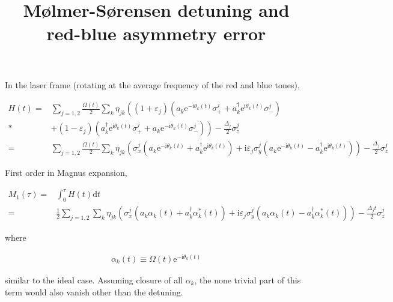 \documentclass[10pt,fleqn]{article}
\title{M{\o}lmer-S{\o}rensen detuning and red-blue asymmetry error}
\newcommand{\ud}{\mathrm{d}}
\newcommand{\ue}{\mathrm{e}}
\newcommand{\ui}{\mathrm{i}}
\newcommand{\eqar}[1]
{
  \begin{align*}
    #1
  \end{align*}
}
\newcommand{\paren}[1]{{\left({#1}\right)}}
\newcommand{\lparen}[1]{{\left({#1}\right.}}
\newcommand{\rparen}[1]{{\left.{#1}\right)}}
\begin{document}
\maketitle

In the laser frame (rotating at the average frequency of the red and blue tones),
\eqar{
  H(t)=&\sum_{j=1,2}\frac{\Omega(t)}{2}\sum_{k}\eta_{jk}\lparen{(1+\varepsilon_j)\paren{a_k\ue^{-\ui\theta_k(t)}\sigma^j_++a_k^\dagger\ue^{\ui\theta_k(t)}\sigma^j_-}}\\*
  &\rparen{+(1-\varepsilon_j)\paren{a_k^\dagger\ue^{\ui\theta_k(t)}\sigma^j_++a_k\ue^{-\ui\theta_k(t)}\sigma^j_-}} - \frac{\Delta_j}{2}\sigma_z^j\\
  =&\sum_{j=1,2}\frac{\Omega(t)}{2}\sum_{k}\eta_{jk}\paren{
    \sigma^j_x\paren{a_k\ue^{-\ui\theta_k(t)}+a_k^\dagger\ue^{\ui\theta_k(t)}}
    +\ui\varepsilon_j\sigma^j_y\paren{a_k\ue^{-\ui\theta_k(t)}-a_k^\dagger\ue^{\ui\theta_k(t)}}
  } - \frac{\Delta_j}{2}\sigma_z^j
}

First order in Magnus expansion,
\eqar{
  M_1(\tau)=&\int_0^\tau H(t)\ud t\\
  =&\frac{1}{2}\sum_{j=1,2}\sum_{k}\eta_{jk}\paren{
    \sigma^j_x\paren{a_k\alpha_k(t)+a_k^\dagger\alpha^*_k(t)}
    +\ui\varepsilon_j\sigma^j_y\paren{a_k\alpha_k(t)-a_k^\dagger\alpha^*_k(t)}
  } - \frac{\Delta_jt}{2}\sigma_z^j
}
where
\eqar{
  \alpha_k(t)\equiv\Omega(t)\ue^{-\ui\theta_k(t)}
}
similar to the ideal case. Assuming closure of all $\alpha_k$,
the none trivial part of this term would also vanish other than the detuning.
\end{document}
